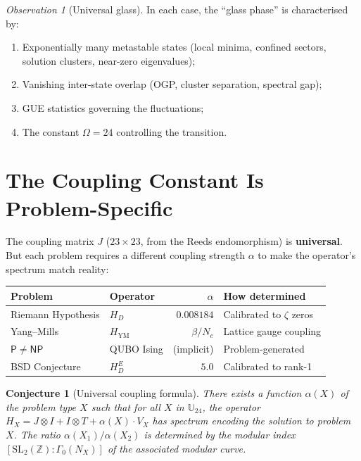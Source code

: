 \documentclass[11pt,a4paper]{article}
\theoremstyle{plain}
\newtheorem{conjecture}[theorem]{Conjecture}
\theoremstyle{definition}
\theoremstyle{remark}
\newtheorem{observation}[theorem]{Observation}
\begin{document}
\begin{observation}[Universal glass]
In each case, the ``glass phase'' is characterised by:
\begin{enumerate}[nosep]
\item Exponentially many metastable states (local minima, confined sectors, solution clusters, near-zero eigenvalues);
\item Vanishing inter-state overlap (OGP, cluster separation, spectral gap);
\item GUE statistics governing the fluctuations;
\item The constant $\Omega = 24$ controlling the transition.
\end{enumerate}
\end{observation}

\section{The Coupling Constant Is Problem-Specific}

The coupling matrix $J$ ($23 \times 23$, from the Reeds endomorphism) is \textbf{universal}. But each problem requires a different coupling strength $\alpha$ to make the operator's spectrum match reality:

\begin{center}\small
\begin{tabular}{llrl}
\toprule
Problem & Operator & $\alpha$ & How determined \\
\midrule
Riemann Hypothesis & $H_D$ & $0.008184$ & Calibrated to $\zeta$ zeros \\
Yang--Mills & $H_{\text{YM}}$ & $\beta/N_c$ & Lattice gauge coupling \\
$\mathsf{P} \neq \mathsf{NP}$ & QUBO Ising & (implicit) & Problem-generated \\
BSD Conjecture & $H_D^E$ & $5.0$ & Calibrated to rank-1 \\
\bottomrule
\end{tabular}
\end{center}

\begin{conjecture}[Universal coupling formula]
There exists a function $\alpha(X)$ of the problem type $X$ such that for all $X$ in $\mathbb{U}_{24}$, the operator $H_X = J \otimes I + I \otimes T + \alpha(X) \cdot V_X$ has spectrum encoding the solution to problem $X$. The ratio $\alpha(X_1)/\alpha(X_2)$ is determined by the modular index $[\text{SL}_2(\mathbb{Z}) : \Gamma_0(N_X)]$ of the associated modular curve.
\end{conjecture}
\end{document}
